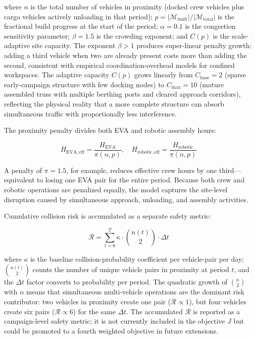 \noindent where $n$ is the total number of vehicles in proximity
(docked crew vehicles plus cargo vehicles actively unloading in that
period); $p = |\mathcal{M}_{\mathrm{built}}| /
|\mathcal{M}_{\mathrm{total}}|$ is the fractional build progress
at the start of the period; $\alpha = 0.1$ is the congestion
sensitivity parameter; $\beta = 1.5$ is the crowding exponent;
and $C(p)$ is the scale-adaptive site capacity.
The exponent $\beta > 1$ produces super-linear penalty growth:
adding a third vehicle when two are already present costs more
than adding the second, consistent with empirical coordination-overhead
models for confined workspaces.
The adaptive capacity $C(p)$ grows linearly from $C_{\mathrm{base}} = 2$
(sparse early-campaign structure with few docking nodes) to
$C_{\mathrm{max}} = 10$ (mature assembled truss with multiple
berthing ports and cleared approach corridors), reflecting the
physical reality that a more complete structure can absorb
simultaneous traffic with proportionally less interference.

The proximity penalty divides both EVA and robotic assembly hours:

\begin{equation}
  H_{\mathrm{EVA,eff}} = \frac{H_{\mathrm{EVA}}}{\pi(n,p)}, \quad
  H_{\mathrm{robotic,eff}} = \frac{H_{\mathrm{robotic}}}{\pi(n,p)}
\end{equation}

\noindent A penalty of $\pi = 1.5$, for example, reduces effective
crew hours by one third---equivalent to losing one EVA pair for
the entire period.
Because both crew and robotic operations are penalized equally,
the model captures the site-level disruption caused by simultaneous
approach, unloading, and assembly activities.

Cumulative collision risk is accumulated as a separate safety metric:

\begin{equation}
  \mathcal{R} = \sum_{t=0}^{T} \kappa \cdot \binom{n(t)}{2} \cdot \Delta t
  \label{eq:risk}
\end{equation}

\noindent where $\kappa$ is the baseline collision-probability
coefficient per vehicle-pair per day; $\binom{n(t)}{2}$ counts
the number of unique vehicle pairs in proximity at period $t$,
and the $\Delta t$ factor converts to probability per period.
The quadratic growth of $\binom{n}{2}$ with $n$ means that
simultaneous multi-vehicle operations are the dominant risk
contributor: two vehicles in proximity create one pair ($\mathcal{R}
\propto 1$), but four vehicles create six pairs ($\mathcal{R}
\propto 6$) for the same $\Delta t$.
The accumulated $\mathcal{R}$ is reported as a campaign-level
safety metric; it is not currently included in the objective $J$
but could be promoted to a fourth weighted objective in future
extensions.

